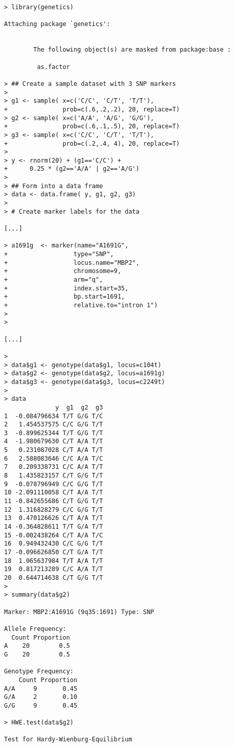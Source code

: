 \documentclass{report}
\begin{document}
{\small
\begin{verbatim}
> library(genetics)

Attaching package `genetics':


        The following object(s) are masked from package:base :

         as.factor 

> ## Create a sample dataset with 3 SNP markers
> 
> g1 <- sample( x=c('C/C', 'C/T', 'T/T'), 
+               prob=c(.6,.2,.2), 20, replace=T)
> g2 <- sample( x=c('A/A', 'A/G', 'G/G'), 
+               prob=c(.6,.1,.5), 20, replace=T)
> g3 <- sample( x=c('C/C', 'C/T', 'T/T'), 
+               prob=c(.2,.4, 4), 20, replace=T)
> 
> y <- rnorm(20) + (g1=='C/C') + 
+      0.25 * (g2=='A/A' | g2=='A/G')
> 
> ## Form into a data frame
> data <- data.frame( y, g1, g2, g3)
> 
> # Create marker labels for the data 

[...]

> a1691g  <- marker(name="A1691G",
+                  type="SNP",
+                  locus.name="MBP2",
+                  chromosome=9, 
+                  arm="q", 
+                  index.start=35,
+                  bp.start=1691,
+                  relative.to="intron 1")
> 
> 

[...]

> 
> data$g1 <- genotype(data$g1, locus=c104t)
> data$g2 <- genotype(data$g2, locus=a1691g)
> data$g3 <- genotype(data$g3, locus=c2249t)
> 
> data
              y  g1  g2  g3
1  -0.084796634 T/T G/G T/C
2   1.454537575 C/C G/G T/T
3  -0.899625344 T/T G/G T/T
4  -1.980679630 C/T A/A T/T
5   0.231087028 C/T A/A T/T
6   2.588083646 C/C A/A T/C
7   0.209338731 C/C A/A T/T
8   1.435823157 C/T G/G T/T
9  -0.078796949 C/C G/G T/T
10 -2.091110058 C/T A/A T/T
11 -0.842655686 C/T G/G T/T
12  1.316828279 C/C G/G T/T
13  0.470126626 C/T A/A T/T
14 -0.364828611 T/T G/A T/T
15 -0.002438264 C/T A/A T/C
16  0.949432430 C/C G/G T/T
17 -0.096626850 C/T G/A T/T
18  1.065637984 T/T A/A T/T
19  0.817213289 C/C A/A T/T
20  0.644714638 C/T G/G T/T
> 
> summary(data$g2)

Marker: MBP2:A1691G (9q35:1691) Type: SNP

Allele Frequency:
  Count Proportion
A    20        0.5
G    20        0.5

Genotype Frequency:
    Count Proportion
A/A     9       0.45
G/A     2       0.10
G/G     9       0.45

> HWE.test(data$g2)

Test for Hardy-Wienburg-Equilibrium


\end{verbatim}}
\end{document}

